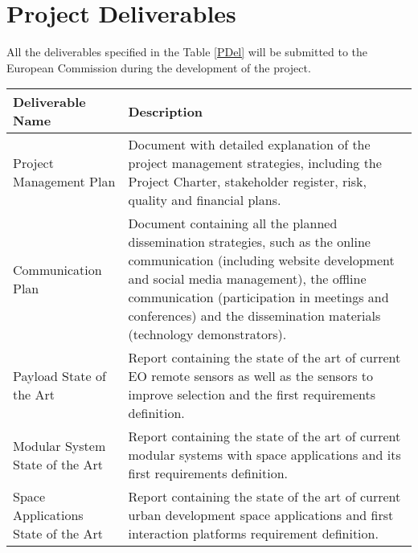 \section{Project Deliverables}

All the deliverables specified in the Table \ref{PDel} will be submitted to the European Commission during the development of the project. 

\begin{longtable}[H]{>{\raggedright\arraybackslash}p{4cm} p{10cm}}
	
	\toprule[2pt]
	
	\textbf{Deliverable Name} & \textbf{Description} \\ 
	
	\midrule[1.5pt] 
	\endhead
	
	
	Project Management Plan & 
	Document with detailed explanation of the project management strategies, including the Project Charter, stakeholder register, risk, quality and financial plans. 
	\vspace{0.2cm}
	\\ \midrule
	
	Communication Plan  & 
	Document containing all the planned dissemination strategies, such as the online communication (including website development and social media management), the offline communication (participation in meetings and conferences) and the dissemination materials (technology demonstrators). 
	\vspace{0.2cm}
	\\ \midrule

	Payload State of the Art  & 
	Report containing the state of the art of current EO remote sensors as well as the sensors to improve selection and the first requirements definition.  
	\vspace{0.2cm}
	\\ \midrule

	Modular System State of the Art  & 
	Report containing the state of the art of current modular systems with space applications and its first requirements definition.  
	\vspace{0.2cm}
	\\ \midrule

	Space Applications State of the Art & 
	Report containing the state of the art of current urban development space applications and first interaction platforms requirement definition.  
	\vspace{0.2cm}
	\\ \midrule


\end{longtable}
